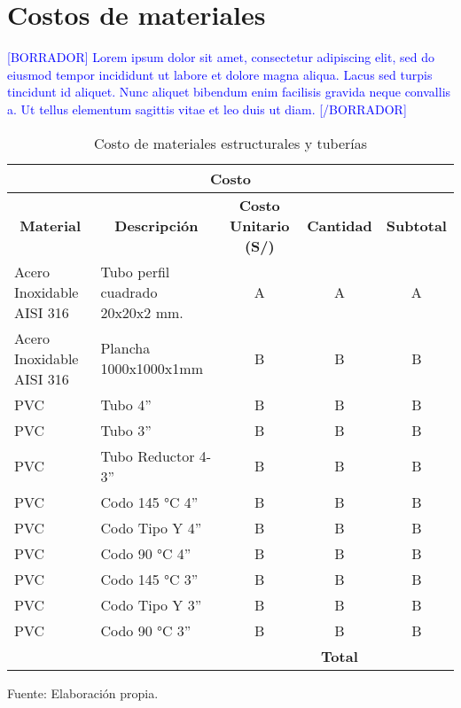 \section{Costos de materiales}

\textcolor{blue}{[BORRADOR] Lorem ipsum dolor sit amet, consectetur adipiscing elit, sed do eiusmod tempor incididunt ut labore et dolore magna aliqua. Lacus sed turpis tincidunt id aliquet. Nunc aliquet bibendum enim facilisis gravida neque convallis a. Ut tellus elementum sagittis vitae et leo duis ut diam. [/BORRADOR]} 

\begin{table}[H]
	\footnotesize\centering
	\caption{Costo de materiales estructurales y tuberías}
	\label{tab:costo de materiales estructurales y tuberias}
	\begin{tabular}{llc|c|c|}
		\hline
		\multicolumn{5}{|c|}{\textbf{Costo}} \\ \hline
		\multicolumn{1}{|c|}{\textbf{Material}} & \multicolumn{1}{c|}{\textbf{Descripción}} & \multicolumn{1}{c|}{\textbf{Costo Unitario (S/)}} & \multicolumn{1}{c|}{\textbf{Cantidad}} & \multicolumn{1}{c|}{\textbf{Subtotal}} \\ \hline
		\multicolumn{1}{|l|}{Acero Inoxidable AISI 316} & \multicolumn{1}{l|}{Tubo perfil cuadrado 20x20x2 mm.} & A & A & A \\ \hline
		\multicolumn{1}{|l|}{Acero Inoxidable AISI 316} & \multicolumn{1}{l|}{Plancha 1000x1000x1mm} & B & B & B \\ \hline
		\multicolumn{1}{|l|}{PVC} & \multicolumn{1}{l|}{Tubo 4''} & B & B & B \\ \hline
		\multicolumn{1}{|l|}{PVC} & \multicolumn{1}{l|}{Tubo 3''} & B & B & B \\ \hline
		\multicolumn{1}{|l|}{PVC} & \multicolumn{1}{l|}{Tubo Reductor 4-3''} & B & B & B \\ \hline
		\multicolumn{1}{|l|}{PVC} & \multicolumn{1}{l|}{Codo 145 °C 4''} & B & B & B \\ \hline
		\multicolumn{1}{|l|}{PVC} & \multicolumn{1}{l|}{Codo Tipo Y 4''} & B & B & B \\ \hline
		\multicolumn{1}{|l|}{PVC} & \multicolumn{1}{l|}{Codo 90 °C 4''} & B & B & B \\ \hline
		\multicolumn{1}{|l|}{PVC} & \multicolumn{1}{l|}{Codo 145 °C 3''} & B & B & B \\ \hline
		\multicolumn{1}{|l|}{PVC} & \multicolumn{1}{l|}{Codo Tipo Y 3''} & B & B & B \\ \hline
		\multicolumn{1}{|l|}{PVC} & \multicolumn{1}{l|}{Codo 90 °C 3''} & B & B & B \\ \hline
		
		&  &  & \textbf{Total} & \textbf{} \\ \cline{4-5} 
	\end{tabular}
	\begin{myflushcenteraftertable}	
		Fuente: Elaboración propia.
	\end{myflushcenteraftertable}
\end{table}

